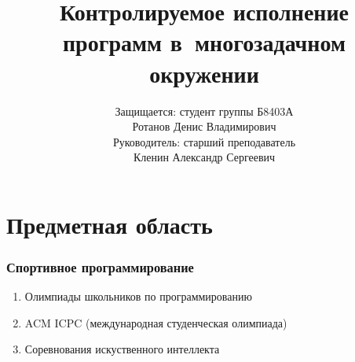 \documentclass{beamer}
\title{Контролируемое исполнение программ в~многозадачном окружении}
\author{Защищается: студент группы Б8403А \\ Ротанов Денис Владимирович \\ Руководитель: старший преподаватель \\ Кленин Александр Сергеевич}
\institute{Дальневосточный Федеральный университет, 2015г.}
\begin{document}
\setcounter{showProgressBar}{0}
\setcounter{showSlideNumbers}{0}

\frame{\titlepage}

\setcounter{framenumber}{0}
\setcounter{showProgressBar}{1}
\setcounter{showSlideNumbers}{1}

\section{Предметная область}

\begin{frame}
  \frametitle{Спортивное программирование}
  \begin{enumerate}
    \item Олимпиады школьников по программированию
    \item ACM ICPC (международная студенческая олимпиада)
    \item Соревнования искуственного интеллекта
  \end{enumerate}
\end{frame}






\end{document}
